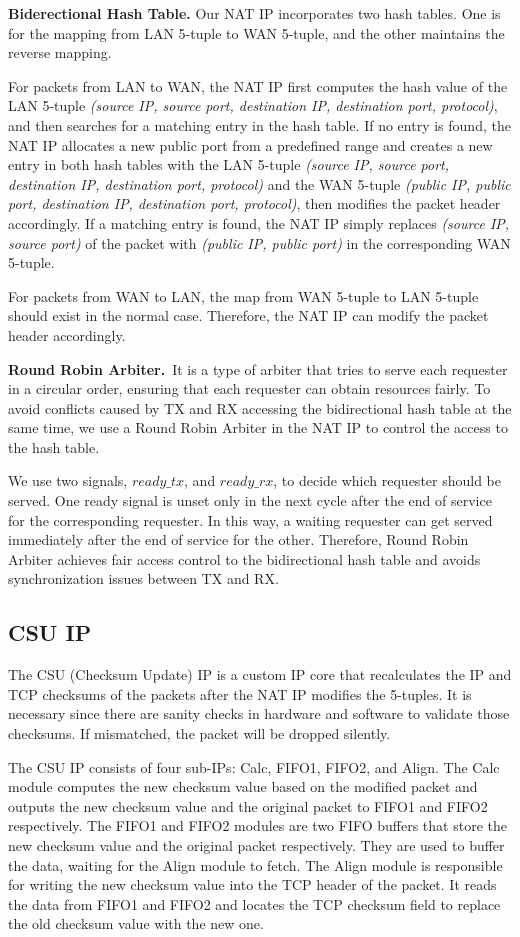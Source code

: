     \textbf{Biderectional Hash Table.} Our NAT IP incorporates two hash tables. One is for the mapping from LAN 5-tuple to WAN 5-tuple, and the other maintains the reverse mapping.

    For packets from LAN to WAN, the NAT IP first computes the hash value of the LAN 5-tuple \emph{(source IP, source port, destination IP, destination port, protocol)}, and then searches for a matching entry in the hash table. If no entry is found, the NAT IP allocates a new public port from a predefined range and creates a new entry in both hash tables with the LAN 5-tuple \emph{(source IP, source port, destination IP, destination port, protocol)} and the WAN 5-tuple \emph{(public IP, public port, destination IP, destination port, protocol)}, then modifies the packet header accordingly. If a matching entry is found, the NAT IP simply replaces \emph{(source IP,  source port)} of the packet with \emph{(public IP, public port)} in the corresponding WAN 5-tuple.

    For packets from WAN to LAN, the map from WAN 5-tuple to LAN 5-tuple should exist in the normal case. Therefore, the NAT IP can modify the packet header accordingly.

    \textbf{Round Robin Arbiter.}\ It is a type of arbiter that tries to serve each requester in a circular order, ensuring that each requester can obtain resources fairly. To avoid conflicts caused by TX and RX accessing the bidirectional hash table at the same time, we use a Round Robin Arbiter in the NAT IP to control the access to the hash table. 

    We use two signals, $ready\_tx$, and $ready\_rx$, to decide which requester should be served. One ready signal is unset only in the next cycle after the end of service for the corresponding requester. In this way, a waiting requester can get served immediately after the end of service for the other. Therefore, Round Robin Arbiter achieves fair access control to the bidirectional hash table and avoids synchronization issues between TX and RX.
    
\subsection{CSU IP}
    The CSU (Checksum Update) IP is a custom IP core that recalculates the IP and TCP checksums of the packets after the NAT IP modifies the 5-tuples. It is necessary since there are sanity checks in hardware and software to validate those checksums. If mismatched, the packet will be dropped silently. 
    
    The CSU IP consists of four sub-IPs: Calc, FIFO1, FIFO2, and Align. 
    The Calc module computes the new checksum value based on the modified packet and outputs the new checksum value and the original packet to FIFO1 and FIFO2 respectively.
    The FIFO1 and FIFO2 modules are two FIFO buffers that store the new checksum value and the original packet respectively. They are used to buffer the data, waiting for the Align module to fetch. 
    The Align module is responsible for writing the new checksum value into the TCP header of the packet. It reads the data from FIFO1 and FIFO2 and locates the TCP checksum field to replace the old checksum value with the new one.